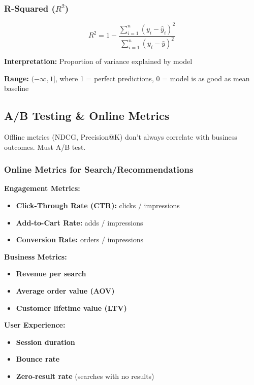 \documentclass[11pt,letterpaper]{article}
\begin{document}
\subsubsection{R-Squared ($R^2$)}

\begin{equation}
R^2 = 1 - \frac{\sum_{i=1}^{n} (y_i - \hat{y}_i)^2}{\sum_{i=1}^{n} (y_i - \bar{y})^2}
\end{equation}

\textbf{Interpretation:} Proportion of variance explained by model

\textbf{Range:} $(-\infty, 1]$, where 1 = perfect predictions, 0 = model is as good as mean baseline

\subsection{A/B Testing \& Online Metrics}

Offline metrics (NDCG, Precision@K) don't always correlate with business outcomes. Must A/B test.

\subsubsection{Online Metrics for Search/Recommendations}

\textbf{Engagement Metrics:}
\begin{itemize}
    \item \textbf{Click-Through Rate (CTR):} clicks / impressions
    \item \textbf{Add-to-Cart Rate:} adds / impressions
    \item \textbf{Conversion Rate:} orders / impressions
\end{itemize}

\textbf{Business Metrics:}
\begin{itemize}
    \item \textbf{Revenue per search}
    \item \textbf{Average order value (AOV)}
    \item \textbf{Customer lifetime value (LTV)}
\end{itemize}

\textbf{User Experience:}
\begin{itemize}
    \item \textbf{Session duration}
    \item \textbf{Bounce rate}
    \item \textbf{Zero-result rate} (searches with no results)
\end{itemize}
\end{document}
